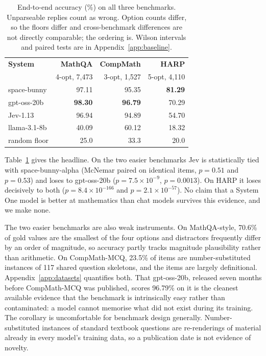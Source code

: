 \documentclass[11pt]{article}
\newcommand{\hi}[1]{\cellcolor{cellmagenta}\textbf{#1}}
\begin{document}
\begin{table}[t]
\centering
\small
\setlength{\tabcolsep}{3.4pt}
\begin{tabular}{lrrr}
\toprule
\textbf{System} & \textbf{MathQA} & \textbf{CompMath} & \textbf{HARP} \\
 & \scriptsize 4-opt, 7{,}473 & \scriptsize 3-opt, 1{,}527 & \scriptsize 5-opt, 4{,}110 \\
\midrule
space-bunny & 97.11 & 95.35 & \hi{81.29} \\
gpt-oss-20b & \hi{98.30} & \hi{96.79} & 70.29 \\
Jev-1.13 & 96.94 & 94.89 & 54.70 \\
llama-3.1-8b & 40.09 & 60.12 & 18.32 \\
\midrule
\scriptsize random floor & \scriptsize 25.0 & \scriptsize 33.3 & \scriptsize 20.0 \\
\bottomrule
\end{tabular}
\caption{End-to-end accuracy (\%) on all three benchmarks. Unparseable replies count as wrong. Option counts differ, so the floors differ and cross-benchmark differences are not directly comparable; the ordering is. Wilson intervals and paired tests are in Appendix~\ref{app:baseline}.}
\label{tab:accuracy}
\end{table}

Table~\ref{tab:accuracy} gives the headline. On the two easier benchmarks Jev is statistically tied with space-bunny-alpha (McNemar paired on identical items, $p = 0.51$ and $p = 0.53$) and loses to gpt-oss-20b ($p = 7.5\times10^{-9}$, $p = 0.0013$). On HARP it loses decisively to both ($p = 8.4\times10^{-166}$ and $p = 2.1\times10^{-57}$). No claim that a System One model is better at mathematics than chat models survives this evidence, and we make none.

The two easier benchmarks are also weak instruments. On MathQA-style, 70.6\% of gold values are the smallest of the four options and distractors frequently differ by an order of magnitude, so accuracy partly tracks magnitude plausibility rather than arithmetic. On CompMath-MCQ, 23.5\% of items are number-substituted instances of 117 shared question skeletons, and the items are largely definitional. Appendix~\ref{app:datasets} quantifies both. That gpt-oss-20b, released seven months before CompMath-MCQ was published, scores 96.79\% on it is the cleanest available evidence that the benchmark is intrinsically easy rather than contaminated: a model cannot memorise what did not exist during its training. The corollary is uncomfortable for benchmark design generally. Number-substituted instances of standard textbook questions are re-renderings of material already in every model's training data, so a publication date is not evidence of novelty.
\end{document}

